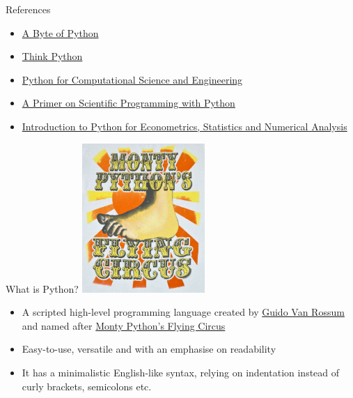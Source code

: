\documentclass[pdf]{beamer}
\begin{document}
\begin{frame}{References}

\begin{itemize}\addtolength{\itemsep}{\baselineskip}
	\item \href{https://python.swaroopch.com/}{A Byte of Python}
	\item \href{http://greenteapress.com/wp/think-python/}{Think Python}
	\item \href{http://www.southampton.ac.uk/~fangohr/training/python/pdfs/Python-for-Computational-Science-and-Engineering.pdf}{Python for Computational Science and Engineering}
	\item \href{https://hplgit.github.io/primer.html/doc/pub/half/book.pdf}{A Primer on Scientific Programming with Python}
	\item \href{https://www.kevinsheppard.com/Python_for_Econometrics}{Introduction to Python for Econometrics, Statistics and Numerical Analysis}
\end{itemize}

\end{frame}

\begin{frame}{What is Python?}
\centering
\includegraphics[width=0.35\textwidth]{monty_python.jpg}

\small
\begin{itemize}\addtolength{\itemsep}{.2\baselineskip}
	\item<2-> A scripted high-level programming language created by \href{https://en.wikipedia.org/wiki/Guido_van_Rossum}{Guido Van Rossum} and named after \href{https://en.wikipedia.org/wiki/Monty_Python's_Flying_Circus}{Monty Python's Flying Circus}
	\item<3-> Easy-to-use, versatile and with an emphasise on readability
	\item<4-> It has a minimalistic English-like syntax, relying on indentation instead of curly brackets, semicolons etc. 
\end{itemize}
\normalsize

\end{frame}
\end{document}
